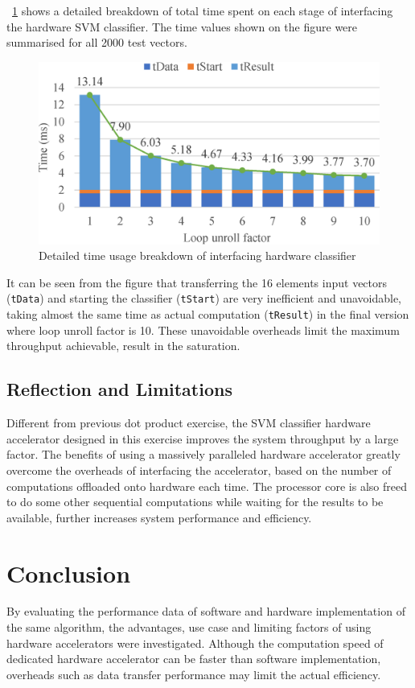 \documentclass[journal]{IEEEtran}
\newcommand{\fref}[1]{\figurename~\ref{#1}}
\begin{document}
\fref{fig:time} shows a detailed breakdown of total time spent on each stage of interfacing the hardware SVM classifier. The time values shown on the figure were summarised for all 2000 test vectors.

\begin{figure}[t]
	\centering
	\includegraphics[width=0.9\columnwidth]{time}
	\caption{Detailed time usage breakdown of interfacing hardware classifier}
	\label{fig:time}
\end{figure}

It can be seen from the figure that transferring the 16 elements input vectors (\texttt{tData}) and starting the classifier (\texttt{tStart}) are very inefficient and unavoidable, taking almost the same time as actual computation (\texttt{tResult}) in the final version where loop unroll factor is 10. These unavoidable overheads limit the maximum throughput achievable, result in the saturation.

\subsection{Reflection and Limitations}

Different from previous dot product exercise, the SVM classifier hardware accelerator designed in this exercise improves the system throughput by a large factor. The benefits of using a massively paralleled hardware accelerator greatly overcome the overheads of interfacing the accelerator, based on the number of computations offloaded onto hardware each time. The processor core is also freed to do some other sequential computations while waiting for the results to be available, further increases system performance and efficiency.

\section{Conclusion}

By evaluating the performance data of software and hardware implementation of the same algorithm, the advantages, use case and limiting factors of using hardware accelerators were investigated. Although the computation speed of dedicated hardware accelerator can be faster than software implementation, overheads such as data transfer performance may limit the actual efficiency.




\end{document}
